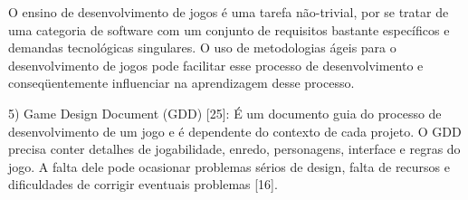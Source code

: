 





O ensino de desenvolvimento de jogos é uma tarefa não-trivial, por se tratar de uma categoria de software com um conjunto de requisitos bastante específicos e demandas tecnológicas singulares. O uso de metodologias ágeis para o desenvolvimento de jogos pode facilitar esse processo de desenvolvimento e conseqüentemente influenciar na aprendizagem desse processo.




5) Game Design Document (GDD) [25]: É um documento guia do processo de desenvolvimento de um jogo e é dependente do contexto de cada projeto. O GDD precisa conter detalhes de jogabilidade, enredo, personagens, interface e regras do jogo. A falta dele pode ocasionar problemas sérios de design, falta de recursos e dificuldades de corrigir eventuais problemas [16]. %








